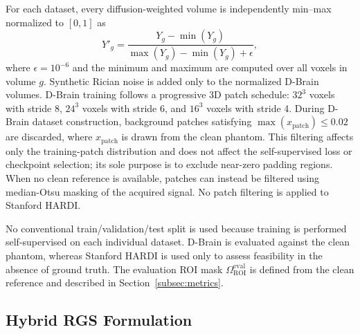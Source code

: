 \documentclass[preprint,12pt]{elsarticle}
\begin{document}
For each dataset, every diffusion-weighted volume is independently min--max normalized to $[0,1]$ as
\[
  Y'_g = \frac{Y_g-\min(Y_g)}{\max(Y_g)-\min(Y_g)+\epsilon},
\]
where $\epsilon=10^{-6}$ and the minimum and maximum are computed over all voxels in volume $g$. Synthetic Rician noise is added only to the normalized D-Brain volumes. D-Brain training follows a progressive 3D patch schedule: $32^3$ voxels with stride 8, $24^3$ voxels with stride 6, and $16^3$ voxels with stride 4. During D-Brain dataset construction, background patches satisfying $\max(x_{\mathrm{patch}})\leq0.02$ are discarded, where $x_{\mathrm{patch}}$ is drawn from the clean phantom. This filtering affects only the training-patch distribution and does not affect the self-supervised loss or checkpoint selection; its sole purpose is to exclude near-zero padding regions. When no clean reference is available, patches can instead be filtered using median-Otsu masking of the acquired signal. No patch filtering is applied to Stanford HARDI.

No conventional train/validation/test split is used because training is performed self-supervised on each individual dataset. D-Brain is evaluated against the clean phantom, whereas Stanford HARDI is used only to assess feasibility in the absence of ground truth. The evaluation ROI mask $\Omega_{\mathrm{ROI}}^{\mathrm{eval}}$ is defined from the clean reference and described in Section~\ref{subsec:metrics}.

\subsection{Hybrid RGS Formulation}
\end{document}
